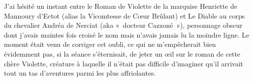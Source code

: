 J’ai hésité un instant entre le Roman de Violette de la marquise Henriette de Mannoury d’Ectot (alias la Vicomtesse de Cœur Brûlant) et Le Diable au corps du chevalier Andréa de Nerciat (aka «~docteur Cazzoné~»), personnage obscur dont j’avais maintes fois croisé le nom mais n’avais jamais lu la moindre ligne. Le moment était venu de corriger cet oubli, ce qui ne m’empêcherait bien évidemment pas, si la séance s’éternisait, de jeter un œil sur le roman de cette chère Violette, créature à laquelle il n’était pas difficile d’imaginer qu’il arrivait tout un tas d’aventures parmi les plus affriolantes.


